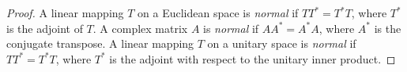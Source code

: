 \begin{proof}
    A linear mapping $T$ on a Euclidean space is \textit{normal} if $TT^* = T^*T$, where $T^*$ is the adjoint of $T$. A complex matrix $A$ is \textit{normal} if $AA^* = A^*A$, where $A^*$ is the conjugate transpose. A linear mapping $T$ on a unitary space is \textit{normal} if $TT^* = T^*T$, where $T^*$ is the adjoint with respect to the unitary inner product.
\end{proof}